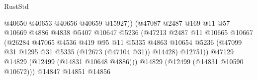 \begin{lexlean}{RustStd}
\begin{coremodule}
{\begin{coremodule}
{{{{{{{{{{{{{{{{{{{{{{{{{{{{{{{{{{{{{{{{{{{{{{{{{{{{{{{{{{{{{{{{{{{{{{{{{{{{{{{{                                                @40650
                                                @40653
                                                @40656
                                                @40659
                                                @15927))
                                            (@47087
                                              @2487
                                              @169
                                              @11
                                              @57
                                              @10669
                                              @4886
                                              @4838
                                              @5407
                                              @10647
                                              @5236
                                              (@47213
                                                @2487
                                                @11
                                                @10665
                                                @10667
                                                (@26284
                                                  @47065
                                                  @4536
                                                  @419
                                                  @95
                                                  @11
                                                  @5335
                                                  @4863
                                                  @10654
                                                  @5236
                                                  (@47099
                                                    @31
                                                    @1295
                                                    @31
                                                    @5335
                                                    (@12673 (@47104 @31))
                                                    @14428)
                                                  @12751))
                                              @47129
                                              @14829
                                              (@12499 (@14831 @10648 @4886)))
                                            @14829
                                            (@12499 (@14831 @10590 @10672)))
                                          @14847
                                          @14851
                                          @14856
}}}}}}}}}}}}}}}}}}}}}}}}}}}}}}}}}}}}}}}}}}}}}}}}}}}}}}}}}}}}}}}}}}}}}}}}}}}}}}}}
\end{coremodule}}
\end{coremodule}
\end{lexlean}
